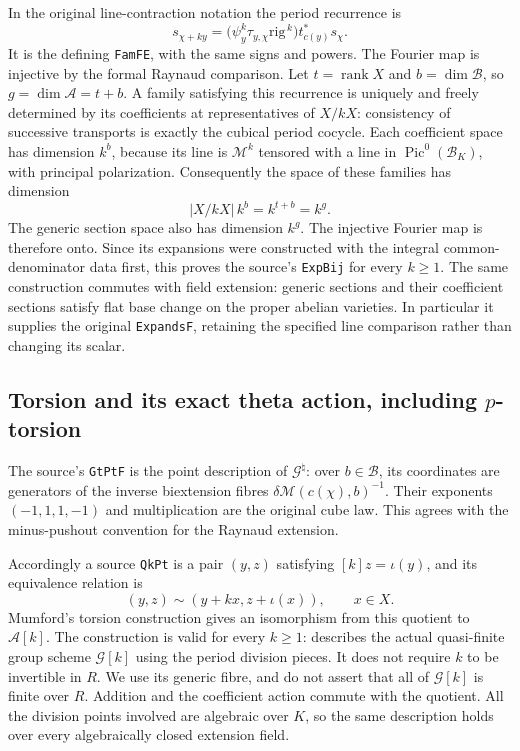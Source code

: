 In the original line-contraction notation the period recurrence is
\[
 s_{\chi+ky}
 =\bigl(\psi_y^k\tau_{y,\chi}\mathrm{rig}^{\,k}\bigr)
                       t_{c(y)}^*s_\chi.
\]
It is the defining \texttt{FamFE}, with the same signs and powers.
The Fourier map is injective by the formal Raynaud comparison.
Let $t=\operatorname{rank}X$ and $b=\dim\mathcal B$, so
$g=\dim\mathcal A=t+b$.  A family satisfying this recurrence is
uniquely and freely determined by its coefficients at representatives
of $X/kX$: consistency of successive transports is exactly the
cubical period cocycle.  Each coefficient space has dimension $k^b$,
because its line is $\mathscr M^k$ tensored with a line in
$\operatorname{Pic}^0(\mathcal B_K)$, with principal polarization.
Consequently the space of these families has dimension
\[
                  |X/kX|\,k^b=k^{t+b}=k^g.
\]
The generic section space also has dimension $k^g$.  The injective
Fourier map is therefore onto.  Since its expansions were constructed
with the integral common-denominator data first, this proves the
source's \texttt{ExpBij} for every $k\geq1$.  The same construction
commutes with field extension: generic sections and their coefficient
sections satisfy flat base change on the proper abelian varieties.
In particular it supplies the original \texttt{ExpandsF}, retaining
the specified line comparison rather than changing its scalar.

\subsection*{Torsion and its exact theta action, including $p$-torsion}

The source's \texttt{GtPtF} is the point description of
$\mathcal G^\natural$: over $b\in\mathcal B$, its coordinates are
generators of the inverse biextension fibres
$\delta\mathscr M(c(\chi),b)^{-1}$.  Their exponents
$(-1,1,1,-1)$ and multiplication are the original cube law.
This agrees with the minus-pushout convention for the Raynaud
extension\cite[Definition 4.2.1.13]{dvr-unif-lan}.

Accordingly a source \texttt{QkPt} is a pair $(y,z)$ satisfying
$[k]z=\iota(y)$, and its equivalence relation is
\[
              (y,z)\sim(y+kx,z+\iota(x)),\qquad x\in X.
\]
Mumford's torsion construction gives an isomorphism from this quotient
to $\mathcal A[k]$.  The construction is valid for every $k\geq1$:
\cite[Theorem 4.5.3.10]{dvr-unif-lan} describes the actual quasi-finite
group scheme $\mathcal G[k]$ using the period division pieces.
It does not require $k$ to be invertible in $R$.  We use its generic
fibre, and do not assert that all of $\mathcal G[k]$ is finite over
$R$.  Addition and the coefficient action commute with the quotient.
All the division points involved are algebraic over $K$, so the same
description holds over every algebraically closed extension field.

